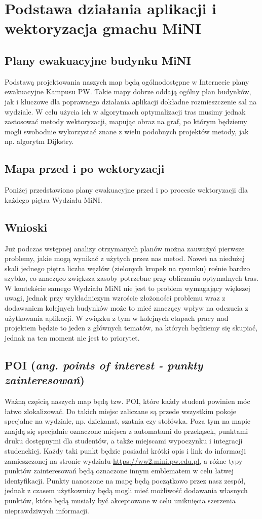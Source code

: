 \documentclass[14pt,a4paper]{extarticle}
\begin{document}
\section{Podstawa działania aplikacji i wektoryzacja gmachu MiNI}

\subsection{Plany ewakuacyjne budynku MiNI}
Podstawą projektowania naszych map będą ogólnodostępne w Internecie plany ewakuacyjne Kampusu PW. Takie mapy dobrze oddają ogólny plan budynków, jak i kluczowe dla poprawnego działania aplikacji dokładne rozmieszczenie sal na wydziale. W celu użycia ich w algorytmach optymalizacji tras musimy jednak zastosować metody wektoryzacji, mapując obraz na graf, po którym będziemy mogli swobodnie wykorzystać znane z wielu podobnych projektów metody, jak np. algorytm Dijkstry.

\subsection{Mapa przed i po wektoryzacji}
Poniżej przedstawiono plany ewakuacyjne przed i po procesie wektoryzacji dla każdego piętra Wydziału MiNI.

\subsection{Wnioski}
Już podczas wstępnej analizy otrzymanych planów można zauważyć pierwsze problemy, jakie mogą wynikać z użytych przez nas metod. Nawet na niedużej skali jednego piętra liczba węzłów (zielonych kropek na rysunku) rośnie bardzo szybko, co znacząco zwiększa zasoby potrzebne przy obliczaniu optymalnych tras. W kontekście samego Wydziału MiNI nie jest to problem wymagający większej uwagi, jednak przy wykładniczym wzroście złożoności problemu wraz z dodawaniem kolejnych budynków może to mieć znaczący wpływ na odczucia z użytkowania aplikacji. W związku z tym w kolejnych etapach pracy nad projektem będzie to jeden z głównych tematów, na których będziemy się skupiać, jednak na ten moment nie jest to priorytet.

\subsection{POI (\textit{ang. points of interest - punkty zainteresowań})}
Ważną częścią naszych map będą tzw. POI, które każdy student powinien móc łatwo zlokalizować. Do takich miejsc zaliczane są przede wszystkim pokoje specjalne na wydziale, np. dziekanat, szatnia czy stołówka. Poza tym na mapie znajdą się specjalnie oznaczone miejsca z automatami do przekąsek, punktami druku dostępnymi dla studentów, a także miejscami wypoczynku i integracji studenckiej. Każdy taki punkt będzie posiadał krótki opis i link do informacji zamieszczonej na stronie wydziału \url{https://ww2.mini.pw.edu.pl}, a różne typy punktów zainteresowań będą oznaczone innym emblematem w celu łatwej identyfikacji. Punkty nanoszone na mapę będą początkowo przez nasz zespół, jednak z czasem użytkownicy będą mogli mieć możliwość dodawania własnych punktów, które będą musiały być akceptowane w celu uniknięcia szerzenia nieprawdziwych informacji.
\end{document}
